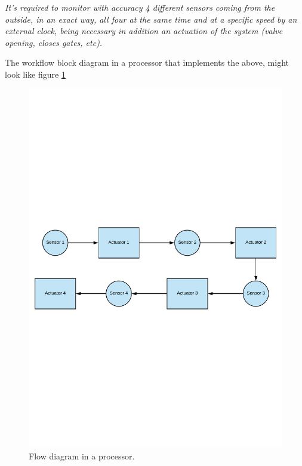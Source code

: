 \textsl{It’s required to monitor with accuracy 4 different sensors coming from the outside, in an exact way, all four at the same time and at a specific speed by an external clock, being necessary in addition an actuation of the system (valve opening, closes gates, etc).}\newline

The workflow block diagram in a processor that implements the above, might look like figure \ref{fig:processor_sensor}

\begin{center}
	\begin{figure}[H]
		\center
		\includegraphics[trim = 0mm 10cm 0mm 10cm, clip,scale=0.5]{imagenes/EstadoArte/processor_sensor.pdf}
		\caption{Flow diagram in a processor.}
		\label{fig:processor_sensor}
	\end{figure}
\end{center} 


